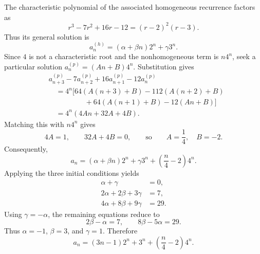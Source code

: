 \documentclass[11pt,oneside]{article}
\begin{document}
\begin{solution}
The characteristic polynomial of the associated homogeneous recurrence factors as
\[
    r^3-7r^2+16r-12=(r-2)^2(r-3).
\]
Thus its general solution is
\[
    a_n^{(h)}=(\alpha+\beta n)2^n+\gamma3^n.
\]
Since $4$ is not a characteristic root and the nonhomogeneous term is $n4^n$, seek a particular solution $a_n^{(p)}=(An+B)4^n$. Substitution gives
\[
\begin{aligned}
    &a_{n+3}^{(p)}-7a_{n+2}^{(p)}
       +16a_{n+1}^{(p)}-12a_n^{(p)}\\
    &\quad=4^n\bigl[64(A(n+3)+B)-112(A(n+2)+B)\\
    &\qquad\qquad\quad+64(A(n+1)+B)-12(An+B)\bigr]\\
    &\quad=4^n(4An+32A+4B).
\end{aligned}
\]
Matching this with $n4^n$ gives
\[
    4A=1,\qquad 32A+4B=0,
    \qquad\text{so}\qquad A=\frac14,\quad B=-2.
\]
Consequently,
\[
    a_n=(\alpha+\beta n)2^n+\gamma3^n
        +\left(\frac{n}{4}-2\right)4^n.
\]
Applying the three initial conditions yields
\[
\begin{aligned}
    \alpha+\gamma&=0,\\
    2\alpha+2\beta+3\gamma&=7,\\
    4\alpha+8\beta+9\gamma&=29.
\end{aligned}
\]
Using $\gamma=-\alpha$, the remaining equations reduce to
\[
    2\beta-\alpha=7,\qquad 8\beta-5\alpha=29.
\]
Thus $\alpha=-1$, $\beta=3$, and $\gamma=1$. Therefore
\[
    a_n=(3n-1)2^n+3^n
        +\left(\frac{n}{4}-2\right)4^n.
\]
\end{solution}
\end{document}
